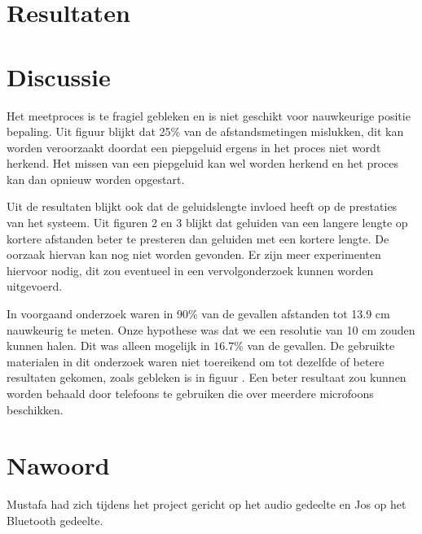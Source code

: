 \documentclass[12pt]{article}
\begin{document}
\section{Resultaten}
\label{sec:resultaten}

\section{Discussie}
\label{sec:discussie}

Het meetproces is te fragiel gebleken en is niet geschikt voor nauwkeurige positie bepaling. Uit figuur blijkt dat 25\% van de afstandsmetingen mislukken, dit kan worden veroorzaakt doordat een piepgeluid ergens in het proces niet wordt herkend. Het missen van een piepgeluid kan wel worden herkend en het proces kan dan opnieuw worden opgestart. 

Uit de resultaten blijkt ook dat de geluidslengte invloed heeft op de prestaties van het systeem. Uit figuren 2 en 3 blijkt dat geluiden van een langere lengte op kortere afstanden beter te presteren dan geluiden met een kortere lengte. De oorzaak hiervan kan nog niet worden gevonden. Er zijn meer experimenten hiervoor nodig, dit zou eventueel in een vervolgonderzoek kunnen worden uitgevoerd.

In voorgaand onderzoek \cite{qiu2011feasibility} waren in 90\% van de gevallen afstanden tot 13.9 cm nauwkeurig te meten. Onze hypothese was dat we een resolutie van 10 cm zouden kunnen halen. Dit was alleen mogelijk in $16.7\%$ van de gevallen. De gebruikte materialen in dit onderzoek waren niet toereikend om tot dezelfde of betere resultaten gekomen, zoals gebleken is in figuur . Een beter resultaat zou kunnen worden behaald door telefoons te gebruiken die over meerdere microfoons beschikken.

\section{Nawoord}
\label{sec:nawoord}
Mustafa had zich tijdens het project gericht op het audio gedeelte en Jos op het Bluetooth gedeelte.




\end{document}
